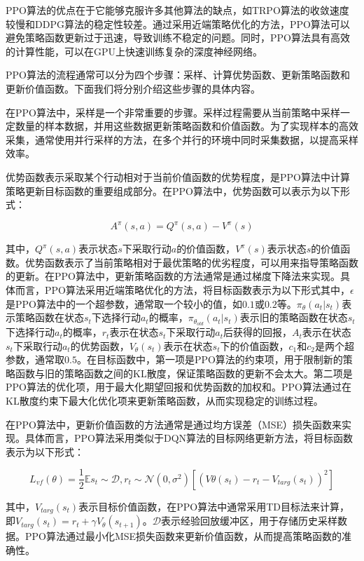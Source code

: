 PPO算法的优点在于它能够克服许多其他算法的缺点，如TRPO算法的收敛速度较慢和DDPG算法的稳定性较差。通过采用近端策略优化的方法，PPO算法可以避免策略函数更新过于迅速，导致训练不稳定的问题。同时，PPO算法具有高效的计算性能，可以在GPU上快速训练复杂的深度神经网络。


PPO算法的流程通常可以分为四个步骤：采样、计算优势函数、更新策略函数和更新价值函数。下面我们将分别介绍这些步骤的具体内容。


在PPO算法中，采样是一个非常重要的步骤。采样过程需要从当前策略中采样一定数量的样本数据，并用这些数据更新策略函数和价值函数。为了实现样本的高效采集，通常使用并行采样的方法，在多个并行的环境中同时采集数据，以提高采样效率。

优势函数表示采取某个行动相对于当前价值函数的优势程度，是PPO算法中计算策略更新目标函数的重要组成部分。在PPO算法中，优势函数可以表示为以下形式：

$$A^{\pi}(s,a)=Q^{\pi}(s,a)-V^{\pi}(s)$$

其中，$Q^{\pi}(s,a)$表示状态$s$下采取行动$a$的价值函数，$V^{\pi}(s)$表示状态$s$的价值函数。优势函数表示了当前策略相对于最优策略的优劣程度，可以用来指导策略函数的更新。在PPO算法中，更新策略函数的方法通常是通过梯度下降法来实现。具体而言，PPO算法采用近端策略优化的方法，将目标函数表示为以下形式其中，$\epsilon$是PPO算法中的一个超参数，通常取一个较小的值，如$0.1$或$0.2$等。$\pi_{\theta}(a_t|s_t)$表示策略函数在状态$s_t$下选择行动$a_t$的概率，$\pi_{\theta_{old}}(a_t|s_t)$表示旧的策略函数在状态$s_t$下选择行动$a_t$的概率，$r_t$表示在状态$s_t$下采取行动$a_t$后获得的回报，$A_t$表示在状态$s_t$下采取行动$a_t$的优势函数，$V_{\theta}(s_t)$表示在状态$s_t$下的价值函数，$c_1$和$c_2$是两个超参数，通常取$0.5$。在目标函数中，第一项是PPO算法的约束项，用于限制新的策略函数与旧的策略函数之间的KL散度，保证策略函数的更新不会太大。第二项是PPO算法的优化项，用于最大化期望回报和优势函数的加权和。PPO算法通过在KL散度约束下最大化优化项来更新策略函数，从而实现稳定的训练过程。

在PPO算法中，更新价值函数的方法通常是通过均方误差（MSE）损失函数来实现。具体而言，PPO算法采用类似于DQN算法的目标网络更新方法，将目标函数表示为以下形式：

$$L_{vf}(\theta)=\frac{1}{2}\mathbb{E}{s_t\sim \mathcal{D},r_t\sim \mathcal{N}(0,\sigma^2)}[(V{\theta}(s_t)-r_t-V_{targ}(s_t))^2]$$

其中，$V_{targ}(s_t)$表示目标价值函数，在PPO算法中通常采用TD目标法来计算，即$V_{targ}(s_t)=r_t+\gamma V_{\theta}(s_{t+1})$。$\mathcal{D}$表示经验回放缓冲区，用于存储历史采样数据。PPO算法通过最小化MSE损失函数来更新价值函数，从而提高策略函数的准确性。

